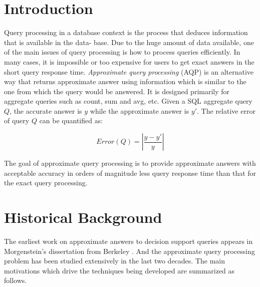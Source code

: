 \documentclass[twocolumn]{article}
\newcommand*\DNA{\textsc{dna}}
\newcommand*\Let[2]{\State #1 $\gets$ #2}
\begin{document}



\section{Introduction}
Query processing in a database context is the process that deduces information that is available in the data- base. Due to the huge amount of data available, one of the main issues of query processing is how to process queries efficiently. In many cases, it is impossible or too expensive for users to get exact answers in the short query response time. \textit{Approximate query processing} (AQP) is an alternative way that returns approximate answer using information which is similar to the one from which the query would be answered. 
It is designed primarily for aggregate queries such as count, sum and avg, etc. 
Given a SQL aggregate query $Q$, the accurate answer is $y$ while the approximate answer is $y'$. 
The relative error of query $Q$ can be quantified as:

\begin{equation}
\textit{Error}(Q) = |\frac{y-y'}{y}|
\end{equation}

The goal of approximate query processing is to provide approximate answers with acceptable accuracy in orders of magnitude less query response time than that for the exact query processing.

\section{Historical Background}
The earliest work on approximate answers to decision support queries appears in Morgenstein’s dissertation from Berkeley \cite{Morgenstein:1981}. 
And the approximate query processing problem has been studied extensively in the last two decades. 
The main motivations \cite{Garofalakis:2001} which drive the techniques being developed are summarized as follows.
\end{document}
